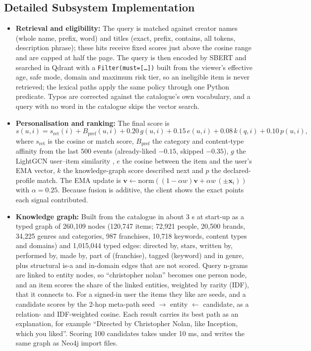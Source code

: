 \documentclass[11pt, a4paper]{article}
\begin{document}
\subsection{Detailed Subsystem Implementation}
\begin{itemize}[noitemsep, topsep=2pt]
    \item \textbf{Retrieval and eligibility:} The query is matched against creator names (whole name, prefix, word) and titles (exact, prefix, contains, all tokens, description phrase); these hits receive fixed scores just above the cosine range and are capped at half the page. The query is then encoded by SBERT and searched in Qdrant with a \texttt{Filter(must=[\dots])} built from the viewer's effective age, safe mode, domain and maximum risk tier, so an ineligible item is never retrieved; the lexical paths apply the same policy through one Python predicate. Typos are corrected against the catalogue's own vocabulary, and a query with no word in the catalogue skips the vector search.
    \item \textbf{Personalisation and ranking:} The final score is
    \[
      s(u,i) = s_{\mathrm{ret}}(i) + B_{\mathrm{pref}}(u,i) + 0.20\,g(u,i) + 0.15\,e(u,i) + 0.08\,k(q,i) + 0.10\,p(u,i),
    \]
    where $s_{\mathrm{ret}}$ is the cosine or match score, $B_{\mathrm{pref}}$ the category and content-type affinity from the last 500 events (already-liked $-0.15$, skipped $-0.35$), $g$ the LightGCN user--item similarity \cite{he2020lightgcn,rendle2009bpr}, $e$ the cosine between the item and the user's EMA vector, $k$ the knowledge-graph score described next and $p$ the declared-profile match. The EMA update is $\mathbf{v} \leftarrow \mathrm{norm}((1-\alpha w)\mathbf{v} + \alpha w\,(\pm\mathbf{x}_i))$ with $\alpha = 0.25$. Because fusion is additive, the client shows the exact points each signal contributed.
    \item \textbf{Knowledge graph:} Built from the catalogue in about 3 s at start-up as a typed graph of 260,109 nodes (120,747 items; 72,921 people, 20,500 brands, 34,225 genres and categories, 987 franchises, 10,718 keywords, content types and domains) and 1,015,044 typed edges: directed by, stars, written by, performed by, made by, part of (franchise), tagged (keyword) and in genre, plus structural is-a and in-domain edges that are not scored. Query n-grams are linked to entity nodes, so ``christopher nolan'' becomes one person node, and an item scores the share of the linked entities, weighted by rarity (IDF), that it connects to. For a signed-in user the items they like are seeds, and a candidate scores by the 2-hop meta-path seed $\rightarrow$ entity $\leftarrow$ candidate, as a relation- and IDF-weighted cosine. Each result carries its best path as an explanation, for example ``Directed by Christopher Nolan, like Inception, which you liked''. Scoring 100 candidates takes under 10 ms, and  writes the same graph as Neo4j import files.

\end{itemize}
\end{document}
